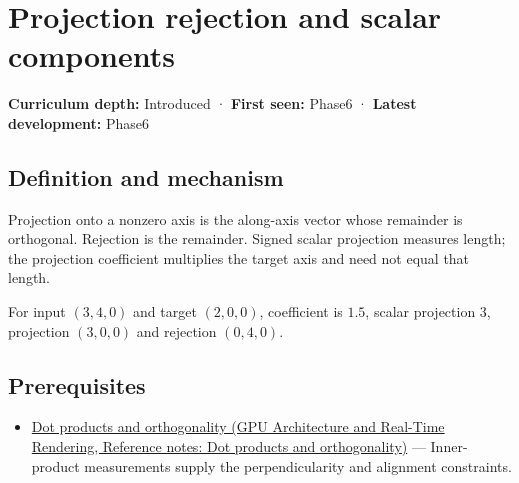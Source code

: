 \hypertarget{appendix-505a502c372a}{}\label{referencestart:appendix-505a502c372a}
\section{Projection rejection and scalar components}\label{appendix-505a502c372a-projection-rejection-and-scalar-components}

\hypertarget{appendix-505a502c372a-projection-rejection-and-scalar-components}{}

\textbf{Curriculum depth:} Introduced · \textbf{First seen:} Phase6 · \textbf{Latest development:} Phase6

\begin{allmightroledefinition}

\subsection{Definition and mechanism}\label{appendix-505a502c372a-definition-and-mechanism}

\hypertarget{appendix-505a502c372a-definition-and-mechanism}{}

Projection onto a nonzero axis is the along-axis vector whose remainder is orthogonal. Rejection is the remainder. Signed scalar projection measures length; the projection coefficient multiplies the target axis and need not equal that length.

\end{allmightroledefinition}

For input \((3,4,0)\) and target \((2,0,0)\), coefficient is \(1.5\), scalar projection \(3\), projection \((3,0,0)\) and rejection \((0,4,0)\).

\subsection{Prerequisites}\label{appendix-505a502c372a-prerequisites}

\hypertarget{appendix-505a502c372a-prerequisites}{}

\begin{itemize}
\tightlist
\item
  \href{../06-GPU-Architecture-and-Real-Time-Rendering/main.pdf\#nameddest=appendix-8bc4e8fc547c}{Dot products and orthogonality (GPU Architecture and Real-Time Rendering, Reference notes: Dot products and orthogonality)} --- Inner-product measurements supply the perpendicularity and alignment constraints.
\end{itemize}

